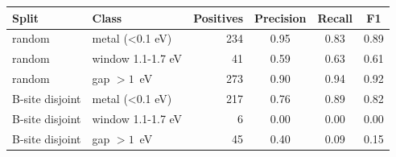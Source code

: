 \begin{tabular}{@{}llrccc@{}}\toprule
Split & Class & Positives & Precision & Recall & F1\\\midrule
random & metal (<0.1 eV) & 234 & 0.95 & 0.83 & 0.89\\
random & window 1.1-1.7 eV & 41 & 0.59 & 0.63 & 0.61\\
random & gap $>1$~eV & 273 & 0.90 & 0.94 & 0.92\\
B-site disjoint & metal (<0.1 eV) & 217 & 0.76 & 0.89 & 0.82\\
B-site disjoint & window 1.1-1.7 eV & 6 & 0.00 & 0.00 & 0.00\\
B-site disjoint & gap $>1$~eV & 45 & 0.40 & 0.09 & 0.15\\
\bottomrule\end{tabular}
